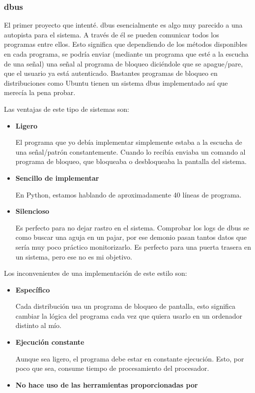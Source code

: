 \documentclass[titlepage, 12pt, a4paper]{article}
\begin{document}
{\subsubsection{\gls{dbus}}
El primer proyecto que intenté. \gls{dbus} esencialmente es algo muy parecido a una autopista para el sistema. A través de él se pueden comunicar todos los programas entre ellos. Esto significa que dependiendo de los métodos disponibles en cada programa, se  podría enviar (mediante un programa que esté a la escucha de una señal) una señal al programa de bloqueo diciéndole que se apague/pare, que el usuario ya está autenticado. Bastantes programas de bloqueo en distribuciones como \gls{Ubuntu} tienen un sistema \gls{dbus} implementado así que merecía la pena probar.\par
Las ventajas de este tipo de sistemas son:
\begin{itemize}
	\item{\textbf{Ligero}}\par
		El programa que yo debía implementar simplemente estaba a la escucha de una señal/patrón constantemente. Cuando lo recibía enviaba un comando al programa de bloqueo, que bloqueaba o desbloqueaba la pantalla del sistema. 
	\item{\textbf{Sencillo de implementar}}\par
		En Python, estamos hablando de aproximadamente 40 líneas de programa.
	\item{\textbf{Silencioso}}\par
		Es perfecto para no dejar rastro en el sistema. Comprobar los logs de \gls{dbus} se como buscar una aguja en un pajar, por ese demonio pasan tantos datos que sería muy poco práctico monitorizarlo. Es perfecto para una puerta trasera en un sistema, pero ese no es mi objetivo.
\end{itemize}
Los inconvenientes de una implementación de este estilo son:
\begin{itemize}
	\item{\textbf{Específico}}\par
		Cada distribución usa un programa de bloqueo de pantalla, esto significa cambiar la lógica del programa cada vez que quiera usarlo en un ordenador distinto al mío.
	\item{\textbf{Ejecución constante}}\par
		Aunque sea ligero, el programa debe estar en constante ejecución. Esto, por poco que sea, consume tiempo de procesamiento del procesador.
	\item{\textbf{No hace uso de las herramientas proporcionadas por }\par
}
\end{itemize}}
\end{document}
